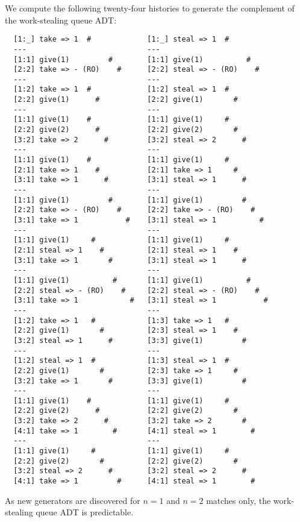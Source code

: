 We compute the following twenty-four histories to generate the complement of
the work-stealing queue ADT:
\begin{verbatim}
  [1:_] take => 1  #             [1:_] steal => 1  #
  ---                            ---
  [1:1] give(1)         #        [1:1] give(1)          #
  [2:2] take => - (RO)    #      [2:2] steal => - (RO)    #
  ---                            ---
  [1:2] take => 1  #             [1:2] steal => 1  #
  [2:2] give(1)      #           [2:2] give(1)       #
  ---                            ---
  [1:1] give(1)    #             [1:1] give(1)     #
  [2:2] give(2)      #           [2:2] give(2)       #
  [3:2] take => 2      #         [3:2] steal => 2      #
  ---                            ---
  [1:1] give(1)    #             [1:1] give(1)     #
  [2:1] take => 1    #           [2:1] take => 1     #
  [3:1] take => 1      #         [3:1] steal => 1      #
  ---                            ---
  [1:1] give(1)         #        [1:1] give(1)         #
  [2:2] take => - (RO)    #      [2:2] take => - (RO)    #
  [3:1] take => 1           #    [3:1] steal => 1          #
  ---                            ---
  [1:1] give(1)     #            [1:1] give(1)     #
  [2:1] steal => 1    #          [2:1] steal => 1    #
  [3:1] take => 1       #        [3:1] steal => 1      #
  ---                            ---
  [1:1] give(1)          #       [1:1] give(1)          #
  [2:2] steal => - (RO)    #     [2:2] steal => - (RO)    #
  [3:1] take => 1            #   [3:1] steal => 1           #
  ---                            ---
  [1:2] take => 1   #            [1:3] take => 1   #
  [2:2] give(1)       #          [2:3] steal => 1    #
  [3:2] steal => 1      #        [3:3] give(1)         #
  ---                            ---
  [1:2] steal => 1  #            [1:3] steal => 1  #
  [2:2] give(1)       #          [2:3] take => 1     #
  [3:2] take => 1       #        [3:3] give(1)         #
  ---                            ---
  [1:1] give(1)    #             [1:1] give(1)     #
  [2:2] give(2)      #           [2:2] give(2)       #
  [3:2] take => 2      #         [3:2] take => 2       #
  [4:1] take => 1        #       [4:1] steal => 1        #
  ---                            ---
  [1:1] give(1)     #            [1:1] give(1)     #
  [2:2] give(2)       #          [2:2] give(2)       #
  [3:2] steal => 2      #        [3:2] steal => 2      #
  [4:1] take => 1         #      [4:1] steal => 1        #
\end{verbatim}
As new generators are discovered for $n=1$ and $n=2$ matches only, the
work-stealing queue ADT is predictable.
